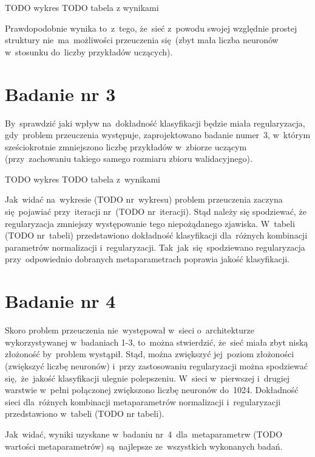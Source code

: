 TODO wykres
TODO tabela z wynikami

Prawdopodobnie wynika to~z~tego, że~sieć z~powodu swojej względnie prostej struktury nie~ma~możliwości przeuczenia
się~(zbyt mała liczba neuronów w~stosunku do~liczby przykładów uczących).

\section{Badanie nr 3}
By~sprawdzić jaki wpływ na~dokładność klasyfikacji będzie miała regularyzacja, gdy~problem przeuczenia występuje,
zaprojektowano badanie numer~3, w~którym sześciokrotnie zmniejszono liczbę przykładów w~zbiorze uczącym (przy~zachowaniu
takiego samego rozmiaru zbioru walidacyjnego).

TODO wykres
TODO tabela z~wynikami

Jak~widać na~wykresie (TODO nr~wykresu) problem przeuczenia zaczyna się~pojawiać przy~iteracji nr~(TODO nr~iteracji).
Stąd należy się spodziewać, że regularyzacja zmniejszy występowanie tego niepożądanego zjawiska. W~tabeli
(TODO nr~tabeli) przedstawiono dokładność klasyfikacji dla~różnych kombinacji parametrów normalizacji i~regularyzacji.
Tak~jak~się~spodziewano regularyzacja przy~odpowiednio dobranych metaparametrach poprawia jakość klasyfikacji.

\section{Badanie nr 4}
Skoro problem przeuczenia nie~występował w~sieci o~architekturze wykorzystywanej w~badaniach 1-3, to~można stwierdzić,
że~sieć miała zbyt niską złożoność by~problem wystąpił. Stąd, można zwiększyć jej~poziom złożoności (zwiększyć liczbę
neuronów) i~przy zastosowaniu regularyzacji można spodziewać się,~że~jakość klasyfikacji ulegnie polepszeniu. W~sieci
w~pierwszej i~drugiej warstwie w~pełni połączonej zwiększono liczbę neuronów do~1024. Dokładność
sieci dla~różnych kombinacji metaparametrów normalizacji i~regularyzacji przedstawiono w~tabeli (TODO nr tabeli).

Jak~widać, wyniki uzyskane w~badaniu nr~4~dla~metaparametrw (TODO wartości metaparametrów) są~najlepsze ze~wszystkich
wykonanych badań.